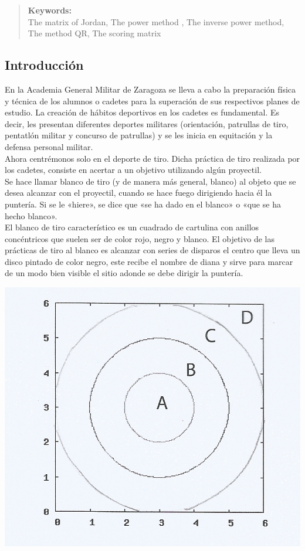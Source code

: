 \documentclass[12pt,a4paper]{article}
\begin{document}
\begin{quotation}
	{\small
		\noindent \textbf{Keywords:} \\ 
		The matrix of Jordan, The power method , The inverse power method, The method QR, The scoring matrix \\
	}
\end{quotation}

\newpage

\begin{multicols}{2}
\section{Introducción}

\noindent En la Academia General Militar de Zaragoza se lleva a cabo la preparación física y técnica de los alumnos o cadetes para la superación de sus respectivos planes de estudio. La creación de hábitos deportivos en los cadetes es fundamental. Es decir, les presentan diferentes deportes militares (orientación, patrullas de tiro, pentatlón militar y concurso de patrullas) y se les inicia en equitación y la defensa personal militar.\\
\noindent Ahora centrémonos solo en el deporte de tiro. Dicha práctica de tiro realizada por los cadetes, consiste en acertar a un objetivo utilizando algún proyectil.\\ Se hace llamar blanco de tiro (y de manera más general, blanco) al objeto que se desea alcanzar con el proyectil, cuando se hace fuego dirigiendo hacia él la puntería. Si se le «hiere», se dice que «se ha dado en el blanco» o «que se ha hecho blanco». \\
\noindent El blanco de tiro característico es un cuadrado de cartulina con anillos concéntricos que suelen ser de color rojo, negro y blanco. El objetivo de las prácticas de tiro al blanco es alcanzar con series de disparos el  centro que lleva un disco pintado de color negro, este recibe el nombre de diana y sirve para marcar de un modo bien visible el sitio adonde se debe dirigir la puntería.
\begin{center}
\includegraphics[scale=0.25]{diana.png}\\

\end{center}
\end{multicols}
\end{document}
